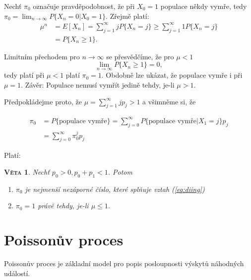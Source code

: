 \documentclass[10pt]{article}
\newtheorem{proposition}{\textsc{Věta}}
\begin{document}
Nechť $\pi_0$ označuje pravděpodobnost, že při $X_0 = 1$ populace někdy vymře, tedy $\pi_0 = \lim_{n \to \infty} P\{X_n=0|X_0=1\}$. Zřejmě platí:
\begin{equation}
\begin{split}
\mu^n 	&=E[X_n] = \sum_{j=1}^{\infty} j P\{X_n=j\} \geq \sum_{j=1}^{\infty} 1 P\{X_n=j\}\\
		&=P\{X_n \geq 1\}.
\end{split}
\end{equation}

Limitním přechodem pro $n \to \infty$ se přesvědčíme, že pro $\mu < 1$ $$\lim_{n \to \infty} P\{X_n \geq 1\} = 0,$$ tedy platí při $\mu <1$ platí $\pi_0=1$. Obdobně lze ukázat, že populace vymře i při $\mu = 1$. Závěr: Populace nemusí vymřít jedině tehdy, je-li $\mu>1$.

Předpokládejme proto, že $\mu = \sum_{j=1}^\infty j p_j > 1$ a všimněme si, že

\begin{equation}
\label{eq:diing}
\begin{split}
\pi_0 	&= P\{\text{populace vymře}\} = \sum_{j=0}^\infty P\{\text{populace vymře} | X_1 = j\} p_j\\
		&= \sum_{j=0}^\infty \pi_0^j p_j
\end{split}
\end{equation}

Platí:
\begin{proposition}
Nechť $p_0>0, p_0+p_1 < 1$. Potom
\begin{enumerate}
\item $\pi_0$ je nejmenší nezáporné číslo, které splňuje vztah (\ref{eq:diing})
\item $\pi_0 = 1$ právě tehdy, je-li $\mu \leq 1$.
\end{enumerate}
\end{proposition}

\section{Poissonův proces}
Poissonův proces je základní model pro popis posloupnosti výskytů náhodných událostí.
\end{document}
